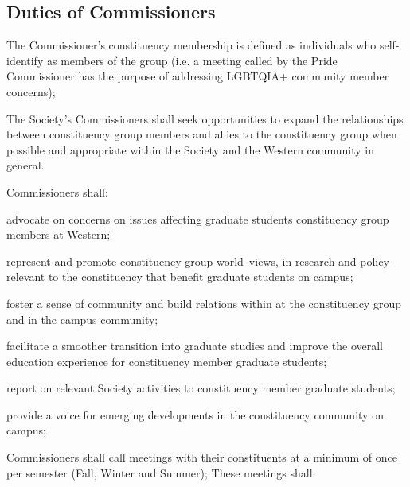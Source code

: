 \subsection{Duties of Commissioners}
\begin{longenum}[ label*=\thesubsection.\arabic*., align=left]
\item The Commissioner's constituency membership is defined as individuals who self-identify as members of the group (i.e. a meeting called by the Pride Commissioner has the purpose of addressing LGBTQIA+ community member concerns);

\item The Society's Commissioners shall seek opportunities to expand the relationships between constituency group members and allies to the constituency group when possible and appropriate within the Society and the Western community in general.
\item Commissioners shall:
\begin{longenum}[ label*=\arabic*., align=left]
\item  advocate on concerns on issues affecting graduate students constituency group members at Western;
\item  represent and promote constituency group world--views, in research and policy relevant to the constituency that benefit graduate students on campus;
\item  foster a sense of community and build relations within at the constituency group and in the campus community;
\item  facilitate a smoother transition into graduate studies and improve the overall education experience for constituency member graduate students;
\item report on relevant Society activities to constituency member graduate students;
\item  provide a voice for emerging developments in the constituency community on campus;
\end{longenum}
\item Commissioners shall call meetings with their constituents at a minimum of once per semester (Fall, Winter and Summer);\newline
These meetings shall:
\begin{longenum}[ label*=\arabic*., align=left]



\end{longenum}
\end{longenum}
